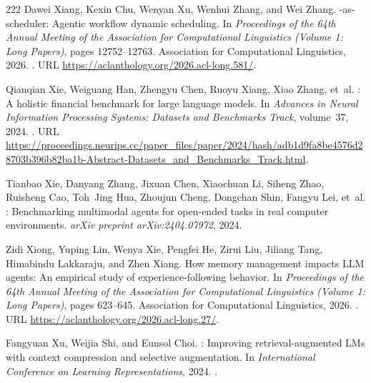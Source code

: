 \begin{thebibliography}{222}
Dawei Xiang, Kexin Chu, Wenyan Xu, Wenhui Zhang, and Wei Zhang.
-as-scheduler: Agentic workflow dynamic scheduling.
\newblock In \emph{Proceedings of the 64th Annual Meeting of the Association
  for Computational Linguistics (Volume 1: Long Papers)}, pages 12752--12763.
  Association for Computational Linguistics, 2026.
\newblock {}.
\newblock URL \url{https://aclanthology.org/2026.acl-long.581/}.

Qianqian Xie, Weiguang Han, Zhengyu Chen, Ruoyu Xiang, Xiao Zhang, et~al.
: A holistic financial benchmark for large language models.
\newblock In \emph{Advances in Neural Information Processing Systems: Datasets
  and Benchmarks Track}, volume~37, 2024{}.
\newblock {}.
\newblock URL
  \url{https://proceedings.neurips.cc/paper_files/paper/2024/hash/adb1d9fa8be4576d28703b396b82ba1b-Abstract-Datasets_and_Benchmarks_Track.html}.

Tianbao Xie, Danyang Zhang, Jixuan Chen, Xiaochuan Li, Siheng Zhao, Ruisheng
  Cao, Toh~Jing Hua, Zhoujun Cheng, Dongchan Shin, Fangyu Lei, et~al.
: Benchmarking multimodal agents for open-ended tasks in
  real computer environments.
\newblock \emph{arXiv preprint arXiv:2404.07972}, 2024{}.

Zidi Xiong, Yuping Lin, Wenya Xie, Pengfei He, Zirui Liu, Jiliang Tang,
  Himabindu Lakkaraju, and Zhen Xiang.
\newblock How memory management impacts {LLM} agents: An empirical study of
  experience-following behavior.
\newblock In \emph{Proceedings of the 64th Annual Meeting of the Association
  for Computational Linguistics (Volume 1: Long Papers)}, pages 623--645.
  Association for Computational Linguistics, 2026.
\newblock {}.
\newblock URL \url{https://aclanthology.org/2026.acl-long.27/}.

Fangyuan Xu, Weijia Shi, and Eunsol Choi.
: Improving retrieval-augmented {LM}s with context
  compression and selective augmentation.
\newblock In \emph{International Conference on Learning Representations},
  2024{}.
\newblock {}.


\end{thebibliography}
